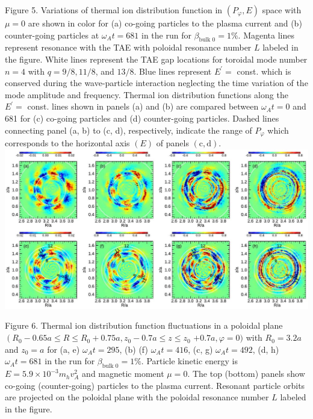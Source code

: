 \documentclass[10pt]{article}
\begin{document}
Figure 5. Variations of thermal ion distribution function in $\left(P_{\varphi}, E\right)$ space with $\mu=0$ are shown in color for (a) co-going particles to the plasma current and (b) counter-going particles at $\omega_{A} t=681$ in the run for $\beta_{\text {bulk } 0}=1 \%$. Magenta lines represent resonance with the TAE with poloidal resonance number $L$ labeled in the figure. White lines represent the TAE gap locations for toroidal mode number $n=4$ with $q=9 / 8,11 / 8$, and $13 / 8$. Blue lines represent $E^{\prime}=$ const. which is conserved during the wave-particle interaction neglecting the time variation of the mode amplitude and frequency. Thermal ion distribution functions along the $E^{\prime}=$ const. lines shown in panels (a) and (b) are compared between $\omega_{A} t=0$ and 681 for (c) co-going particles and (d) counter-going particles. Dashed lines connecting panel (a, b) to (c, d), respectively, indicate the range of $P_{\varphi}$ which corresponds to the horizontal axis $(E)$ of panels $(\mathrm{c}, \mathrm{d})$.
\includegraphics[max width=\textwidth, center]{2023_06_04_de2f4b8aa3fd859f006dg-08(1)}

Figure 6. Thermal ion distribution function fluctuations in a poloidal plane $\left(R_{0}-0.65 a \leqslant R \leqslant R_{0}+0.75 a, z_{0}-0.7 a \leqslant z \leqslant z_{0}\right.$ $+0.7 a, \varphi=0)$ with $R_{0}=3.2 a$ and $z_{0}=a$ for (a, e) $\omega_{A} t=295$, (b) (f) $\omega_{A} t=416$, (c, g) $\omega_{A} t=492$, (d, h) $\omega_{A} t=681$ in the run for $\beta_{\text {bulk } 0}=1 \%$. Particle kinetic energy is $E=5.9 \times 10^{-3} m_{h} v_{A}^{2}$ and magnetic moment $\mu=0$. The top (bottom) panels show co-going (counter-going) particles to the plasma current. Resonant particle orbits are projected on the poloidal plane with the poloidal resonance number $L$ labeled in the figure.
\end{document}
